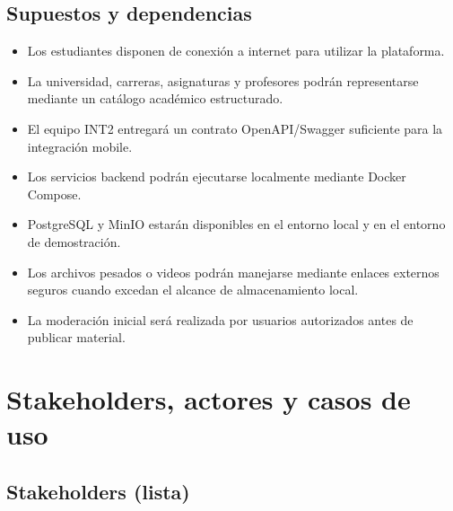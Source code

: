 \documentclass[12pt,a4paper]{article}
\begin{document}
\subsection{Supuestos y dependencias}

\begin{itemize}
    \item Los estudiantes disponen de conexión a internet para utilizar la plataforma.
    \item La universidad, carreras, asignaturas y profesores podrán representarse mediante un catálogo académico estructurado.
    \item El equipo INT2 entregará un contrato OpenAPI/Swagger suficiente para la integración mobile.
    \item Los servicios backend podrán ejecutarse localmente mediante Docker Compose.
    \item PostgreSQL y MinIO estarán disponibles en el entorno local y en el entorno de demostración.
    \item Los archivos pesados o videos podrán manejarse mediante enlaces externos seguros cuando excedan el alcance de almacenamiento local.
    \item La moderación inicial será realizada por usuarios autorizados antes de publicar material.
\end{itemize}

\section{Stakeholders, actores y casos de uso}

\subsection{Stakeholders (lista)}
\end{document}
